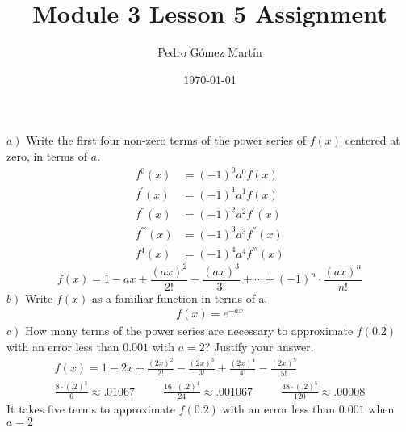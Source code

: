 \documentclass{article}
\author{Pedro G\'{o}mez Mart\'{i}n}
\date{\today}
\title{Module 3 Lesson 5 Assignment}
\begin{document}
\maketitle
\section{}
	$\left.a\right)$  Write the first four non-zero terms of the power series of $f(x)$ centered at zero, in terms of $a$. 
		\begin{align*}
			f^{0}(x)&=\left(-1\right)^{0}a^{0}f\left(x\right)\\
			f^{'}(x)&=\left(-1\right)^{1}a^{1}f\left(x\right)\\
			f^{''}(x)&=\left(-1\right)^{2}a^{2}f^{'}\left(x\right)\\
			f^{'''}(x)&=\left(-1\right)^{3}a^{3}f^{''}\left(x\right)\\
			f^{4}(x)&=\left(-1\right)^{4}a^{4}f^{'''}\left(x\right)
		\end{align*}
		\begin{equation*}
			f(x)=1-ax+\frac{\left(ax\right)^2}{2!}-\frac{\left(ax\right)^{3}}{3!}+\cdots+\left(-1\right)^{n}\cdot\frac{\left(ax\right)^{n}}{n!}
		\end{equation*}
	$\left.b\right)$  Write $f(x)$ as a familiar function in terms of a.
		\begin{align*}
			f(x)=e^{-ax}
		\end{align*}
	$\left.c\right)$ How many terms of the power series are necessary to approximate $f(0.2)$ with an error less than
		$0.001$ with $a = 2$? Justify your answer.
		\begin{align*}
				f(x)=1-2x+\frac{\left(2x\right)^2}{2!}-\frac{\left(2x\right)^{3}}{3!}+\frac{\left(2x\right)^{4}}{4!}-\frac{\left(2x\right)^{5}}{5!}\\
				\frac{8\cdot(.2)^3}{6}\approx .01067\;\ \;\ \;\ \;\ \;\ 	 \frac{16\cdot(.2)^4}{24}\approx .001067\;\ \;\ \;\ \;\ \;\ 	 \frac{48\cdot (.2)^5}{120}\approx .00008
		\end{align*}
		It takes five terms to approximate $f\left(0.2\right)$ with an error less than $0.001$ when $a = 2$
\end{document}
